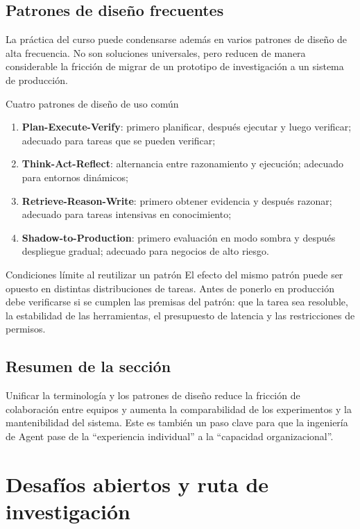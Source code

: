 \documentclass[a4paper]{article}
\begin{document}
\subsection{Patrones de diseño frecuentes}
La práctica del curso puede condensarse además en varios patrones de diseño de alta frecuencia. No son soluciones universales, pero reducen de manera considerable la fricción de migrar de un prototipo de investigación a un sistema de producción.

\begin{knowledgebox}{Cuatro patrones de diseño de uso común}
\begin{enumerate}
    \item \textbf{Plan-Execute-Verify}: primero planificar, después ejecutar y luego verificar; adecuado para tareas que se pueden verificar;
    \item \textbf{Think-Act-Reflect}: alternancia entre razonamiento y ejecución; adecuado para entornos dinámicos;
    \item \textbf{Retrieve-Reason-Write}: primero obtener evidencia y después razonar; adecuado para tareas intensivas en conocimiento;
    \item \textbf{Shadow-to-Production}: primero evaluación en modo sombra y después despliegue gradual; adecuado para negocios de alto riesgo.
\end{enumerate}
\end{knowledgebox}

\begin{warningbox}{Condiciones límite al reutilizar un patrón}
El efecto del mismo patrón puede ser opuesto en distintas distribuciones de tareas. Antes de ponerlo en producción debe verificarse si se cumplen las premisas del patrón: que la tarea sea resoluble, la estabilidad de las herramientas, el presupuesto de latencia y las restricciones de permisos.
\end{warningbox}

\subsection{Resumen de la sección}
Unificar la terminología y los patrones de diseño reduce la fricción de colaboración entre equipos y aumenta la comparabilidad de los experimentos y la mantenibilidad del sistema. Este es también un paso clave para que la ingeniería de Agent pase de la ``experiencia individual'' a la ``capacidad organizacional''.

\section{Desafíos abiertos y ruta de investigación}
\end{document}
